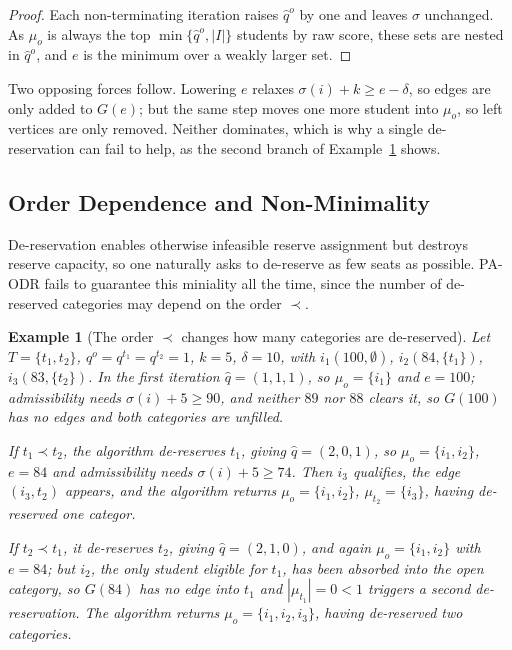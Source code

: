 \documentclass[a4paper,twoside]{article}
\newtheorem{example}{Example}
\theoremstyle{definition}
\begin{document}
\begin{proof}
Each non-terminating iteration raises $\hat q^o$ by one and leaves $\sigma$ unchanged. As $\mu_o$ is always the top $\min\{\hat q^o,|I|\}$ students by raw score, these sets are nested in $\hat q^o$, and $e$ is the minimum over a weakly larger set.
\end{proof}

Two opposing forces follow. Lowering $e$ relaxes $\sigma(i)+k\ge e-\delta$, so edges are only added to $G(e)$; but the same step moves one more student into $\mu_o$, so left vertices are only removed. Neither dominates, which is why a single de-reservation can fail to help, as the second branch of Example~\ref{ex:order} shows.

\subsection{Order Dependence and Non-Minimality}
\label{sec:order}

De-reservation enables otherwise infeasible reserve assignment but destroys reserve capacity, so one naturally asks to de-reserve as few seats as possible. PA-ODR fails to guarantee this miniality all the time, since the number of de-reserved categories may depend on the order $\prec$.

\begin{example}[The order $\prec$ changes how many categories are de-reserved]
\label{ex:order}
Let $T=\{t_1,t_2\}$, $q^o=q^{t_1}=q^{t_2}=1$, $k=5$, $\delta=10$, with $i_1(100,\emptyset)$, $i_2(84,\{t_1\})$, $i_3(83,\{t_2\})$. In the first iteration $\hat q=(1,1,1)$, so $\mu_o=\{i_1\}$ and $e=100$; admissibility needs $\sigma(i)+5\ge90$, and neither $89$ nor $88$ clears it, so $G(100)$ has no edges and both categories are unfilled.

\emph{If $t_1\prec t_2$}, the algorithm de-reserves $t_1$, giving $\hat q=(2,0,1)$, so $\mu_o=\{i_1,i_2\}$, $e=84$ and admissibility needs $\sigma(i)+5\ge74$. Then $i_3$ qualifies, the edge $(i_3,t_2)$ appears, and the algorithm returns $\mu_o=\{i_1,i_2\}$, $\mu_{t_2}=\{i_3\}$, having de-reserved one categor.

\emph{If $t_2\prec t_1$}, it de-reserves $t_2$, giving $\hat q=(2,1,0)$, and again $\mu_o=\{i_1,i_2\}$ with $e=84$; but $i_2$, the only student eligible for $t_1$, has been absorbed into the open category, so $G(84)$ has no edge into $t_1$ and $|\mu_{t_1}|=0<1$ triggers a second de-reservation. The algorithm returns $\mu_o=\{i_1,i_2,i_3\}$, having de-reserved two categories.
\end{example}
\end{document}
